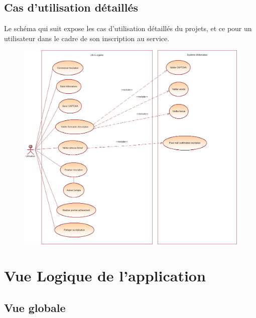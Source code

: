 \documentclass{life-fr}
\begin{document}
\section{Cas d'utilisation détaillés}

Le schéma qui suit expose les cas d'utilisation détaillés du projets, et ce pour un utilisateur dans le cadre de son inscription au service.

\begin{figure}[H]
  \begin{center}
    \includegraphics[width=17cm]{img/use_case_detailles.png}
  \end{center}
\end{figure}


\chapter{Vue Logique de l’application}
\section{Vue globale}
\end{document}
